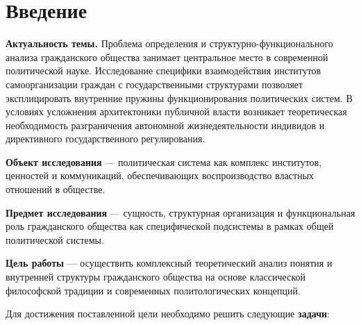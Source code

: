 \section*{Введение}

\textbf{Актуальность темы.} Проблема определения и структурно-функционального анализа гражданского общества занимает центральное место в современной политической науке. Исследование специфики взаимодействия институтов самоорганизации граждан с государственными структурами позволяет эксплицировать внутренние пружины функционирования политических систем. В условиях усложнения архитектоники публичной власти возникает теоретическая необходимость разграничения автономной жизнедеятельности индивидов и директивного государственного регулирования.

\textbf{Объект исследования} — политическая система как комплекс институтов, ценностей и коммуникаций, обеспечивающих воспроизводство властных отношений в обществе.

\textbf{Предмет исследования} — сущность, структурная организация и функциональная роль гражданского общества как специфической подсистемы в рамках общей политической системы.

\textbf{Цель работы} — осуществить комплексный теоретический анализ понятия и внутренней структуры гражданского общества на основе классической философской традиции и современных политологических концепций.

Для достижения поставленной цели необходимо решить следующие \textbf{задачи}:

